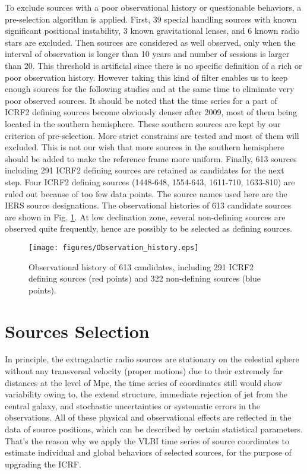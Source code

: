 \documentclass{aa}
\begin{document}
To exclude sources with a poor observational history or questionable behaviors, a pre-selection algorithm is applied. First, 39 special handling sources with known significant positional instability, 3 known gravitational lenses, and 6 known radio stars\citep[see][Sect.~4]{2009ITN....35....1M} are excluded. Then sources are considered as well observed, only when the interval of observation is longer than 10 years and number of sessions is larger than 20. This threshold is artificial since there is no specific definition of a rich or poor observation history. However taking this kind of filter enables us to keep enough sources for the following studies and at the same time to eliminate very poor observed sources. It should be noted that the time series for a part of ICRF2 defining sources become obviously denser after 2009, most of them being located in the southern hemisphere. These southern sources are kept by our criterion of pre-selection. More strict constrains are tested and most of them will excluded. This is not our wish that more sources in the southern hemisphere should be added to make the reference frame more uniform. Finally, 613 sources including 291 ICRF2 defining sources are retained as candidates for the next step. Four ICRF2 defining sources (1448-648, 1554-643, 1611-710, 1633-810) are ruled out because of too few data points. The source names used here are the IERS source designations. The observational histories of 613 candidate sources are shown in Fig. \ref{Fig:ObsHis}. At low declination zone, several non-defining sources are observed quite frequently, hence are possibly to be selected as defining sources.

\begin{figure}
   \centering
   \texttt{[image: figures/Observation\_history.eps]}
      \caption{
      Observational history of 613 candidates, including 291 ICRF2 defining sources (red points) and 322 non-defining sources (blue points).
              }
         \label{Fig:ObsHis}
\end{figure}

\section{Sources Selection}\label{sect:select}
In principle, the extragalactic radio sources are stationary on the celestial sphere without any transversal velocity (proper motions) due to their extremely far distances at the level of Mpc, the time series of coordinates still would show variability owing to, the extend structure, immediate rejection of jet from the central galaxy, and stochastic uncertainties or systematic errors in the observations. All of these physical and observational effects are reflected in the data of source positions, which can be described by certain statistical parameters. That's the reason why we apply the VLBI time series of source coordinates to estimate individual and global behaviors of selected sources, for the purpose of upgrading the ICRF.
\end{document}
